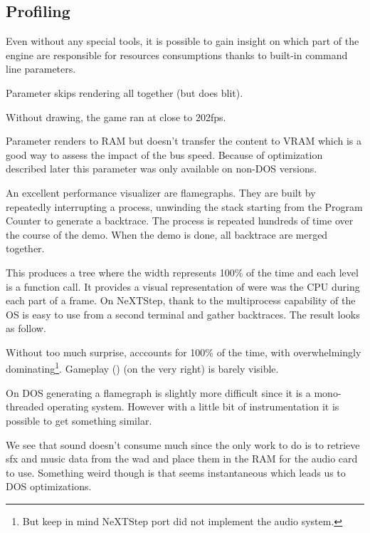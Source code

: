 \subsection{Profiling}
Even without any special tools, it is possible to gain insight on which part of the engine are responsible for resources consumptions thanks to built-in command line parameters.\\
\par
Parameter  skips rendering all together (but does blit).\\
\par
\par
{}
\par
Without drawing, the game ran at close to 202fps.\\
\par
Parameter  renders to RAM but doesn't transfer the content to VRAM which is a good way to assess the impact of the bus speed. Because of optimization described later this parameter was only available on non-DOS versions.\\
\par
{}
\par
An excellent performance visualizer are flamegraphs. They are built by repeatedly interrupting a process, unwinding the stack starting from the Program Counter to generate a backtrace. The process is repeated hundreds of time over the course of the demo. When the demo is done, all backtrace are merged together.\\
\par
 This produces a tree where the width represents 100\% of the time and each level is a function call. It provides a  visual representation of were was the CPU during each part of a frame. On NeXTStep, thank to the multiprocess capability of the OS is easy to use  from a second terminal and gather backtraces. The result looks as follow.\\
\par

\par
Without too much surprise,  acccounts for 100\% of the time, with  overwhelmingly dominating\footnote{But keep in mind NeXTStep port did not implement the audio system.}. Gameplay () (on the very right) is barely visible.\\
\par
On DOS generating a flamegraph is slightly more difficult since it is a mono-threaded operating system. However with a little bit of instrumentation it is possible to get something similar.\\
\par
{}
\par
We see that sound doesn't consume much since the only work to do is to retrieve sfx and music data from the wad and place them in the RAM for the audio card to use. Something weird though is that  seems instantaneous which leads us to DOS optimizations.\\
\par


